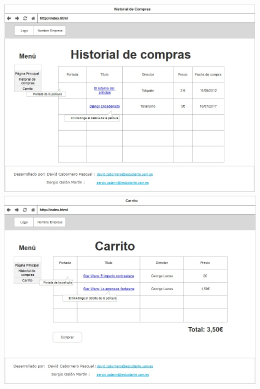 \documentclass[]{article}
\begin{document}
\begin{center}
\includegraphics[scale=0.4]{mockup/Historial.jpeg}
\includegraphics[scale=0.4]{mockup/Carrito.jpeg}
\end{center}
\end{document}
